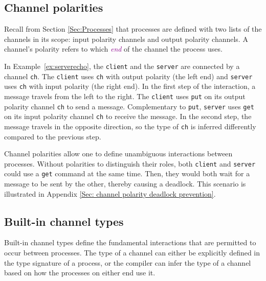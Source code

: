 \documentclass[11pt]{article}
\newcommand{\tc}[1]{\textcolor{darkMagenta}{\textit{#1}}}
\begin{document}

\subsection{Channel polarities}
\label{Sec:polarities}

Recall from Section \ref{Sec:Processes} that processes are defined with two lists of the channels in its scope:
input polarity channels and output polarity channels.
A channel's polarity refers to which \tc{end} of the channel the process uses. 

In Example~\ref{ex:serverecho}, the \lstinline$client$ and the \lstinline$server$ are connected by a channel \lstinline$ch$. The \lstinline$client$ uses \lstinline$ch$ with output polarity (the left end) and \lstinline$server$ uses \lstinline$ch$ with input polarity (the right end).
In the first step of the interaction, a message travels from the left to the right.
The \lstinline$client$ uses \lstinline$put$ on its output polarity channel \lstinline$ch$ to send a message. Complementary to \lstinline$put$, \lstinline$server$ uses \lstinline$get$ on its input polarity channel \lstinline$ch$ to receive the message.
In the second step, the message travels in the opposite direction, so the type of \lstinline$ch$ is inferred differently compared to the previous step.

Channel polarities allow one to define unambiguous interactions between processes. 
Without polarities to distinguish their roles, both \lstinline$client$ and \lstinline$server$ could use a \lstinline$get$ command at the same time.
Then, they would both wait for a message to be sent by the other, thereby causing a deadlock. 
This scenario is illustrated in Appendix \ref{Sec: channel polarity deadlock prevention}.

\subsection{Built-in channel types}
\label{Sec:channeltypes}


Built-in channel types define the fundamental interactions that are permitted to occur between processes.
The type of a channel can either be explicitly defined in the type signature of a process, or the compiler can infer the type of a channel based on how the processes on either end use it.
\end{document}
